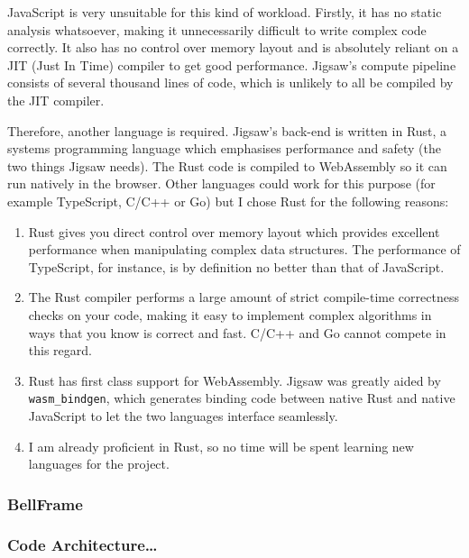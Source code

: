 \documentclass[12pt]{article}
\begin{document}
JavaScript is very unsuitable for this kind of workload.  Firstly, it has no static analysis
whatsoever, making it unnecessarily difficult to write complex code correctly.  It also has no
control over memory layout and is absolutely reliant on a JIT (Just In Time) compiler to get good
performance.  Jigsaw's compute pipeline consists of several thousand lines of code, which is
unlikely to all be compiled by the JIT compiler.


Therefore, another language is required.  Jigsaw's back-end is written in Rust, a systems
programming language which emphasises performance and safety (the two things Jigsaw needs).  The
Rust code is compiled to WebAssembly so it can run natively in the browser.  Other languages could
work for this purpose (for example TypeScript, C/C++ or Go) but I chose Rust for the following
reasons:

\begin{enumerate}
    \item Rust gives you direct control over memory layout which provides excellent performance when
        manipulating complex data structures.  The performance of TypeScript, for instance, is by
        definition no better than that of JavaScript.
    \item The Rust compiler performs a large amount of strict compile-time correctness checks on
        your code, making it easy to implement complex algorithms in ways that you know is correct
        and fast.  C/C++ and Go cannot compete in this regard.
    \item Rust has first class support for WebAssembly.  Jigsaw was greatly aided by
        \verb|wasm_bindgen|, which generates binding code between native Rust and native JavaScript
        to let the two languages interface seamlessly.
    \item I am already proficient in Rust, so no time will be spent learning new languages for the
        project.
\end{enumerate}

\subsubsection{BellFrame}

\subsubsection{Code Architecture\ldots}



\pagebreak
\end{document}
